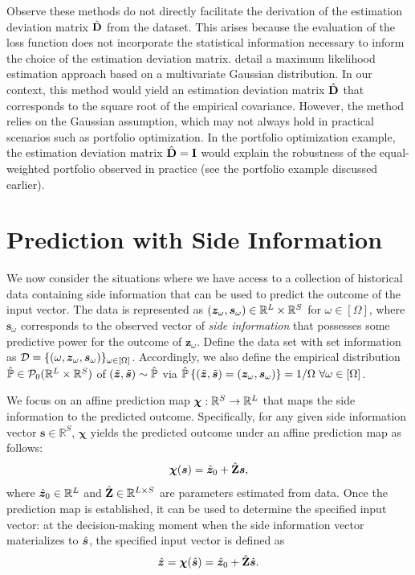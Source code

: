 \documentclass[mnsc, nonblindrev]{informswp}
\newcommand{\1}[1]{\mathds{1}{\left(#1\right)}}
\begin{document}
Observe these methods do not directly facilitate the derivation of the estimation deviation matrix ${\hat{\mathbf{D}}}$ from the dataset. This arises because the evaluation of the loss function does not incorporate the statistical information necessary to inform the choice of the estimation deviation matrix. \cite{Zhu_Xie_Sim_2021joint} detail a maximum likelihood estimation approach based on a multivariate Gaussian distribution. In our context, this method would yield an estimation deviation matrix ${\hat{\mathbf{D}}}$ that corresponds to the square root of the empirical covariance. However, the method relies on the Gaussian assumption, which may not always hold in practical scenarios such as portfolio optimization. In the portfolio optimization example, the estimation deviation matrix ${\hat{\mathbf{D}}} = {\mathbf{I}}$ would explain the robustness of the equal-weighted portfolio observed in practice (see the portfolio example discussed earlier).

\section{Prediction with Side Information}
\label{sec:prediction_with_side_info}

We now consider the situations where we have access to a collection of historical data containing side information that can be used to predict the outcome of the input vector. The data is represented as $(\bm{z}_\omega, \bm s_\omega) \in \mathbb{R}^L \times \mathbb{R}^S$ for $\omega \in [\Omega]$, where $\bm{s}_\omega$ corresponds to the observed vector of \textit{side information} that possesses some predictive power for the outcome of $\bm z_\omega$. Define the data set with set information as $\mathcal{D} = \{(\omega,\bm z_\omega,\bm s_\omega)\}_{\omega  \in [\Omega]}$. Accordingly, we also define the empirical distribution $\hat{\mathbb{P}} \in \mathcal{P}_0(\mathbb{R}^L\times \mathbb{R}^S )$ of $(\tilde{\bm{z}},\tilde{\bm{s}}) \sim \hat{\mathbb{P}}$ via $\hat{\mathbb{P}}\left\{(\tilde{\bm{z}},\tilde{\bm{s}}) = (\bm z_\omega,\bm s_\omega) \right\} = 1/\Omega ~\forall \omega  \in [\Omega]$. 

We focus on an affine prediction map $\bm \chi:\mathbb{R}^S\rightarrow \mathbb{R}^L$ that maps the side information to the predicted outcome. Specifically, for any given side information vector $\bm s \in \mathbb{R}^S$, $\bm \chi$ yields the predicted outcome under an affine prediction map as follows:
$$
\bm \chi(\bm s) = \hat{\bm{z}}_0 + {\hat{\mathbf{Z}}} \bm s,
$$ 
where $\hat{\bm{z}}_0 \in \mathbb{R}^{L}$ and ${\hat{\mathbf{Z}}} \in \mathbb{R}^{L\times S}$ are parameters estimated from data. Once the prediction map is established, it can be used to determine the specified input vector: at the decision-making moment when the side information vector materializes to $\hat{\bm{s}}$, the specified input vector is defined as 
$$
\hat{\bm{z}} = \bm \chi(\hat{\bm{s}}) = \hat{\bm{z}}_0 + {\hat{\mathbf{Z}}} \hat{\bm{s}}.
$$
\end{document}
